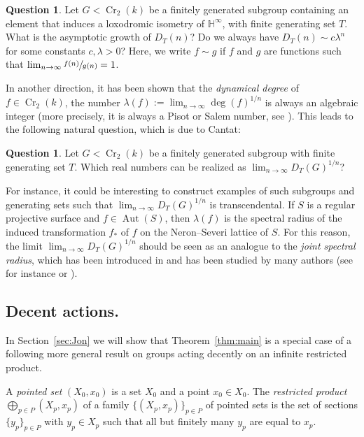 \documentclass[JEP,XML,SOM,Unicode, NoEqCountersInSection,published]{cedram}
\newcommand{\h}{\operatorname{\mathbb{H}^{\infty}}}
\newcommand{\Aut}{\operatorname{Aut}}
\newcommand{\Cr}{\operatorname{Cr}}
\theoremstyle{plain}
\theoremstyle{definition}
\newtheorem{question}[theorem]{Question}
\begin{document}
\begin{question}
Let $G<\Cr_2(k)$ be a finitely generated subgroup containing an element that induces a loxodromic isometry of $\h$, with finite generating set $T$. What is the asymptotic growth of $D_T(n)$? Do we always have $D_T(n)\sim c\lambda^n$ for some constants $c,\lambda>0$? Here, we write $f\sim g$ if $f$ and $g$ are functions such that $\lim_{n\to\infty} \sfrac{f(n)}{g(n)}=1$.

\end{question}

In another direction, it has been shown that the \emph{dynamical degree} of $f\in\Cr_2(k)$, \ie the number $\lambda(f):=\lim_{n\to\infty}\deg(f)^{1/n}$ is always an algebraic integer (more precisely, it is always a Pisot or Salem number, see \cite{blanc2016dynamical}). This leads to the following natural question, which is due to Cantat:

\begin{question}
Let $G<\Cr_2(k)$ be a finitely generated subgroup with finite generating set $T$. Which real numbers can be realized as $\lim_{n\to\infty}D_T(G)^{1/n}$?
\end{question}

For instance, it could be interesting to construct examples of such subgroups and generating sets such that $\lim_{n\to\infty}D_T(G)^{1/n}$ is transcendental. If $S$ is a {regular} projective surface and $f\in\Aut(S)$, then $\lambda(f)$ is the spectral radius of the induced transformation $f_*$ of $f$ on the Neron--Severi lattice of $S$. For this reason, the limit $\lim_{n\to\infty}D_T(G)^{1/n}$ should be seen as an analogue to the \emph{joint spectral radius}, which has been introduced in \cite{rota1960note} and has been studied by many authors (see for instance \cite{jungers2009joint} or \cite{breuillard2021joint}).

\subsection{Decent actions.}
In Section~\ref{sec:Jon} we will show that Theorem~\ref{thm:main} is a special case of a following more general result on groups acting decently on an infinite restricted product.

\label{sum}
A \emph{pointed set} $(X_0,x_0)$ is a set $X_0$ and a point $x_0\in X_0$. The \emph{restricted product} $\bigoplus_{p\in P} (X_p,x_p)$ of a family $\{(X_p,x_p)\}_{p\in P}$ of pointed sets is the set of sections $\{y_p\}_{p\in P}$ with $y_p\in X_p$ such that all but finitely many $y_p$ are equal to $x_p$.
\end{document}
